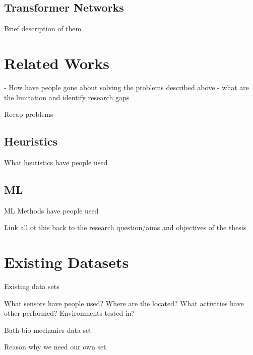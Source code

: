 \subsection{Transformer Networks}
Brief description of them


\section{Related Works} - %
How have people gone about solving the problems described above - what are the limitation and identify research gaps

Recap problems


\subsection{Heuristics}
What heuristics have people used

\subsection{ML} %
ML Methods have people used


Link all of this back to the research question/aims and objectives of the thesis


\section{Existing Datasets} %
Existing data sets

What sensors have people used? Where are the located? What activities have other performed? Environments tested in?

Bath bio mechanics data set

Reason why we need our own set

